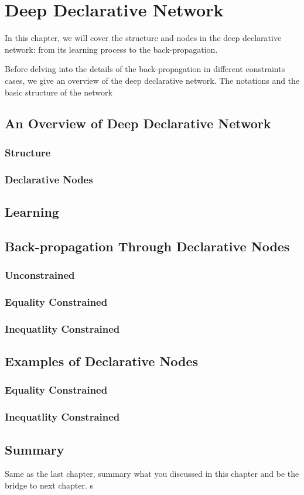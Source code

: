\chapter{Deep Declarative Network}
\label{cha:ddn}
In this chapter, we will cover the structure and nodes in the deep declarative network: from its learning process to the back-propagation.
\par Before delving into the details of the back-propagation in different constraints cases, we give an overview of the deep declarative network. The notations and the basic structure of the network 


\section{An Overview of Deep Declarative Network}
\subsection{Structure}
\subsection{Declarative Nodes}

\section{Learning}


\section{Back-propagation Through Declarative Nodes}

\subsection{Unconstrained}
\subsection{Equality Constrained}
\subsection{Inequatlity Constrained}

\section{Examples of Declarative Nodes}
\subsection{Equality Constrained}

\subsection{Inequatlity Constrained}

\section{Summary}
Same as the last chapter, summary what you discussed in this chapter and
be the bridge to next chapter.
s